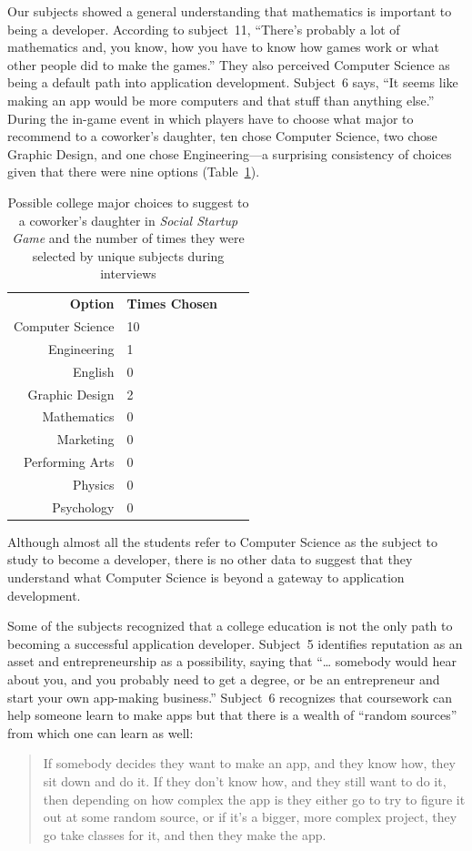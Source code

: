 \documentclass[letterpaper]{article}
\begin{document}
Our subjects showed a general understanding that mathematics is important
to being a developer. According to subject~11, 
``There's probably a lot of mathematics and, you know, how you have to
know how games work or what other people did to make the games.''
% 
They also perceived Computer Science as being a default path into
application development.  Subject~6 says, ``It seems like making an
app would be more computers and that stuff than anything else.''
During the in-game event in which players have to choose what major to recommend
to a coworker's daughter, ten chose Computer Science, two chose 
Graphic Design, and one chose Engineering---a surprising consistency
of choices given that there were nine options (Table~\ref{tab:child-advice}).
%
\begin{table}
\centering
\begin{tabular}{rlrl}
\textbf{Option} & \textbf{Times Chosen}\\
Computer Science & 10\\
Engineering & 1\\
English & 0\\
Graphic Design & 2\\
Mathematics & 0\\
Marketing & 0\\
Performing Arts & 0\\
Physics & 0\\
Psychology & 0
\end{tabular}
\caption{Possible college major choices to suggest to a coworker's daughter 
 in \textit{Social Startup Game} and the number of times they were
 selected by unique subjects during interviews}
\label{tab:child-advice}
\end{table}
%
Although almost all the students refer to Computer Science as the
subject to study to become a developer, there is no other data
to suggest that they understand what Computer Science is beyond a gateway
to application development.

Some of the subjects recognized that a college education is not the only
path to becoming a successful application developer.
Subject~5 identifies reputation as an asset and entrepreneurship as a 
possibility, saying that ``\ldots{} somebody would hear about you, and you probably need to get a degree, or be an entrepreneur and start your own app-making business.''
Subject~6 recognizes that coursework can help someone learn to make apps
but that there is a wealth of ``random sources'' from which one can learn
as well:
\begin{quote}
If somebody decides they want to make 
an app, and they know how, they sit down and do it. If they don't know how,
and they still want to do it, then depending on how complex the app is they 
either go to try to figure it out at some random source, or if it's a bigger,
more complex project, they go take classes for it, and then they make the app.
\end{quote}
\end{document}
